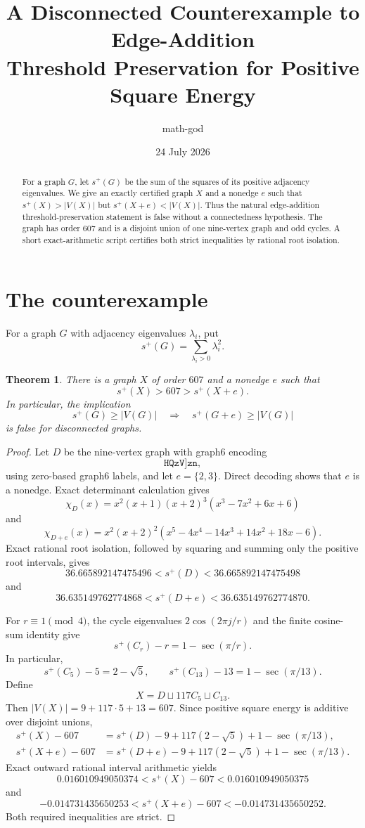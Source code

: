 \documentclass[11pt]{article}
\title{A Disconnected Counterexample to Edge-Addition\\Threshold Preservation for Positive Square Energy}
\author{math-god}
\date{24 July 2026}
\newtheorem{theorem}{Theorem}
\newcommand{\spen}{s^{+}}
\begin{document}
\maketitle

\begin{abstract}
For a graph $G$, let $\spen(G)$ be the sum of the squares of its positive
adjacency eigenvalues.  We give an exactly certified graph $X$ and a nonedge
$e$ such that $\spen(X)>|V(X)|$ but $\spen(X+e)<|V(X)|$.  Thus the natural
edge-addition threshold-preservation statement is false without a
connectedness hypothesis.  The graph has order $607$ and is a disjoint union
of one nine-vertex graph and odd cycles.  A short exact-arithmetic script
certifies both strict inequalities by rational root isolation.
\end{abstract}

\section{The counterexample}
For a graph $G$ with adjacency eigenvalues $\lambda_i$, put
\[
 \spen(G)=\sum_{\lambda_i>0}\lambda_i^2.
\]

\begin{theorem}
There is a graph $X$ of order $607$ and a nonedge $e$ such that
\[
 \spen(X)>607>\spen(X+e).
\]
In particular, the implication
\[
 \spen(G)\ge |V(G)|\quad\Longrightarrow\quad
 \spen(G+e)\ge |V(G)|
\]
is false for disconnected graphs.
\end{theorem}

\begin{proof}
Let $D$ be the nine-vertex graph with graph6 encoding
\[
 \texttt{HQzV]zn},
\]
using zero-based graph6 labels, and let $e=\{2,3\}$.  Direct decoding shows
that $e$ is a nonedge.  Exact determinant calculation gives
\[
 \chi_D(x)=x^2(x+1)(x+2)^3(x^3-7x^2+6x+6)
\]
and
\[
 \chi_{D+e}(x)=x^2(x+2)^2
 (x^5-4x^4-14x^3+14x^2+18x-6).
\]
Exact rational root isolation, followed by squaring and summing only the
positive root intervals, gives
\[
 36.665892147475496<\spen(D)<36.665892147475498
\]
and
\[
 36.635149762774868<\spen(D+e)<36.635149762774870.
\]

For $r\equiv1\pmod4$, the cycle eigenvalues
$2\cos(2\pi j/r)$ and the finite cosine-sum identity give
\[
 \spen(C_r)-r=1-\sec(\pi/r).
\]
In particular,
\[
 \spen(C_5)-5=2-\sqrt5,
 \qquad
 \spen(C_{13})-13=1-\sec(\pi/13).
\]
Define
\[
 X=D\sqcup117C_5\sqcup C_{13}.
\]
Then $|V(X)|=9+117\cdot5+13=607$.  Since positive square energy is
additive over disjoint unions,
\begin{align*}
 \spen(X)-607
 &=\spen(D)-9+117(2-\sqrt5)+1-\sec(\pi/13),\\
 \spen(X+e)-607
 &=\spen(D+e)-9+117(2-\sqrt5)+1-\sec(\pi/13).
\end{align*}
Exact outward rational interval arithmetic yields
\[
 0.016010949050374<\spen(X)-607<0.016010949050375
\]
and
\[
 -0.014731435650253<\spen(X+e)-607
 <-0.014731435650252.
\]
Both required inequalities are strict.
\end{proof}
\end{document}
